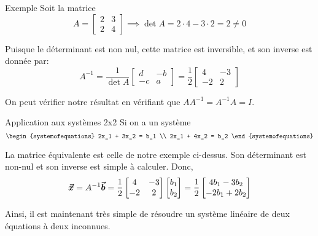 \documentclass[a4paper]{article}
\begin{document}
\begin{parag}{Exemple}
    Soit la matrice
    \[A = \begin{bmatrix} 2 & 3 \\ 2 & 4 \end{bmatrix} \implies \det A = 2\cdot 4 - 3\cdot 2 = 2 \neq 0\]

    Puisque le déterminant est non nul, cette matrice est inversible, et son inverse est donnée par:
    \[A^{-1} = \frac{1}{\det A} \begin{bmatrix} d & -b \\ -c & a \end{bmatrix} = \frac{1}{2}\begin{bmatrix} 4 & -3 \\ -2 & 2 \end{bmatrix} \]

    On peut vérifier notre résultat en vérifiant que $A A^{-1} = A^{-1} A = I$.
\end{parag}

\begin{parag}{Application aux systèmes 2x2}
    Si on a un système
    \[\begin{systemofequations}
    2x_1 + 3x_2 = b_1 \\
    2x_1 + 4x_2 = b_2
    \end{systemofequations}\]

    La matrice équivalente est celle de notre exemple ci-dessus. Son déterminant est non-nul et son inverse est simple à calculer. Donc,
    \[\bm{\protect\vec{x}} = A^{-1} \bm{\protect\vec{b}} = \frac{1}{2}\begin{bmatrix} 4 & -3 \\ -2 & 2 \end{bmatrix} \begin{bmatrix} b_1 \\ b_2 \end{bmatrix} = \frac{1}{2} \begin{bmatrix} 4b_1 - 3b_2 \\ -2b_1 + 2b_2 \end{bmatrix} \]

    Ainsi, il est maintenant très simple de résoudre un système linéaire de deux équations à deux inconnues.
\end{parag}
\end{document}
